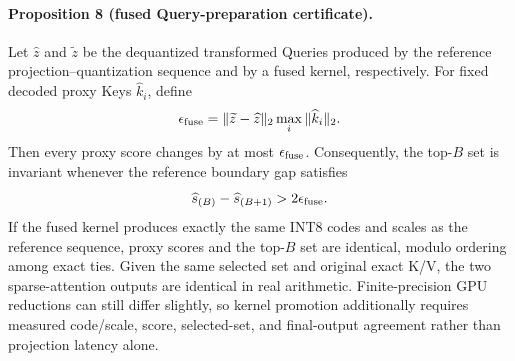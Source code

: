 \paragraph{Proposition 8 (fused Query-preparation certificate).}
Let $\widehat z$ and $\widetilde z$ be the dequantized transformed Queries
produced by the reference projection--quantization sequence and by a fused
kernel, respectively.  For fixed decoded proxy Keys $\widehat k_i$, define
\begin{equation}
 \epsilon_{\rm fuse}
 =
 \|\widetilde z-\widehat z\|_2
 \max_i\|\widehat k_i\|_2 .
 \label{eq:fused-query-epsilon}
\end{equation}
Then every proxy score changes by at most $\epsilon_{\rm fuse}$.
Consequently, the top-$B$ set is invariant whenever the reference boundary
gap satisfies
\begin{equation}
 \widehat s_{(B)}-\widehat s_{(B+1)}
 >2\epsilon_{\rm fuse}.
 \label{eq:fused-query-margin}
\end{equation}
If the fused kernel produces exactly the same INT8 codes and scales as the
reference sequence, proxy scores and the top-$B$ set are identical, modulo
ordering among exact ties.  Given the same selected set and original exact
K/V, the two sparse-attention outputs are identical in real arithmetic.
Finite-precision GPU reductions can still differ slightly, so kernel
promotion additionally requires measured code/scale, score, selected-set,
and final-output agreement rather than projection latency alone.
